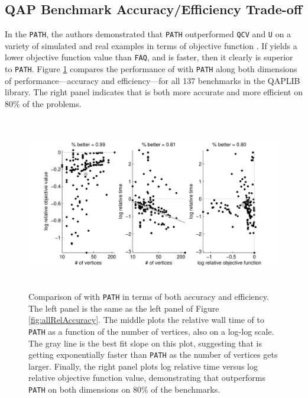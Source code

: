 \documentclass[11pt]{article}
\begin{document}

\subsection{QAP Benchmark Accuracy/Efficiency Trade-off} %
\label{sub:qap_benchmark_accuracy_efficiency_trade_off}

In the \texttt{PATH}, the authors demonstrated that \texttt{PATH} outperformed \texttt{QCV} and \texttt{U} on a variety of simulated and real examples in terms of objective function \cite{Zaslavskiy2009}.  If \FAQ yields a lower objective function value than \texttt{FAQ}, and is faster, then it clearly is superior to \texttt{PATH}.  Figure \ref{fig:tradeoff} compares the performance of \FAQ with \texttt{PATH} along both dimensions of performance---accuracy and efficiency---for all 137 benchmarks in the QAPLIB library.  The right panel indicates that \FAQ is both more accurate and more efficient on $80\%$ of the problems.

\begin{figure}[htbp]
	\centering
		\includegraphics[height=3in]{../figs/allPathCompare.pdf}
	\caption{Comparison of \FAQ with \texttt{PATH} in terms of both accuracy and efficiency.  The left panel is the same as the left panel of Figure \ref{fig:allRelAccuracy}.  The middle plots the relative wall time of \FAQ to \texttt{PATH} as a function of the number of vertices, also on a log-log scale.  The gray line is the best fit slope on this plot, suggesting that \FAQ is getting exponentially faster than \texttt{PATH} as the number of vertices gets larger.  Finally, the right panel plots log relative time versus log relative objective function value, demonstrating that \FAQ outperforms \texttt{PATH} on both dimensions on $80\%$ of the benchmarks.}
	\label{fig:tradeoff}
\end{figure}
\end{document}
